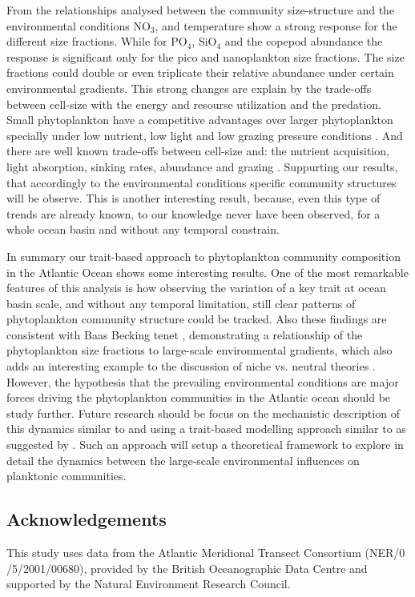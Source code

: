 From the relationships analysed between the community size-structure and the environmental conditions NO$_3$, and temperature show a strong response for the different size fractions. While for PO$_4$, SiO$_4$ and the copepod abundance the response is significant only for the pico and nanoplankton size fractions. The size fractions could double or even triplicate their relative abundance under certain environmental gradients. This strong changes are explain by the trade-offs between cell-size with the energy and resourse utilization and the predation. Small phytoplankton have a competitive advantages over larger phytoplankton specially under low nutrient, low light and low grazing pressure conditions \citep{Litchman2008,Litchman2010}. And there are well known trade-offs between cell-size and: the nutrient acquisition, light absorption, sinking rates, abundance and grazing \citep{Kiorboe1993,Cermeno2008a,Finkel2009a}. Suppurting our results, that accordingly to the environmental conditions specific community structures will be observe. This is another interesting result, because, even this type of trends are already known, to our knowledge never have been observed, for a whole ocean basin and without any temporal constrain. 

In summary our trait-based approach to phytoplankton community composition in the Atlantic Ocean shows some interesting results. One of the most remarkable features of this analysis is how observing the variation of a key trait at ocean basin scale, and without any temporal limitation, still clear patterns of phytoplankton community structure could be tracked. Also these findings are consistent with Baas Becking tenet \citep{BaasBecking1934, DeWit2006,O'Malley2007}, demonstrating a relationship of the phytoplankton size fractions to large-scale environmental gradients, which also adds an interesting example to the discussion of niche vs. neutral theories \citep{Hubbell2001,Mcgill2003}. However, the hypothesis that the prevailing environmental conditions are major forces driving the phytoplankton communities in the Atlantic ocean should be study further. Future research should be focus on the mechanistic description of this dynamics similar to \citet{Falkowski2007} and using a trait-based modelling approach similar to \citet{Bruggeman2007, Merico2009} as suggested by \citet{Follows2011}. Such an approach will setup a theoretical framework to explore in detail the dynamics between the large-scale environmental influences on planktonic communities.

\subsection{Acknowledgements}
This study uses data from the Atlantic Meridional Transect Consortium (NER/0\\/5/2001/00680), provided by the British Oceanographic Data Centre and supported by the Natural Environment Research Council. 
